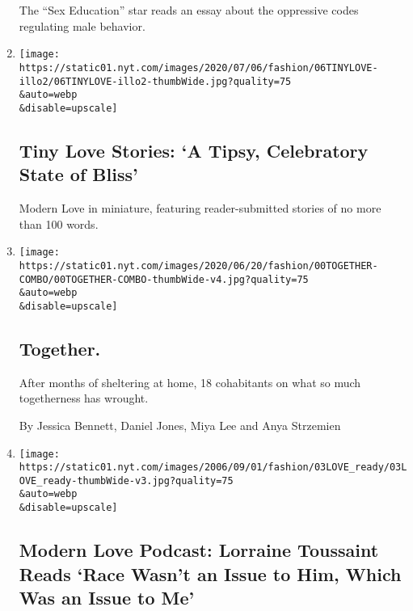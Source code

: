 \begin{enumerate}
  The ``Sex Education'' star reads an essay about the oppressive codes
  regulating male behavior.
\item
  \href{/2020/06/16/style/tiny-modern-love-stories-coronavirus-a-tipsy-celebratory-state-of-bliss.html}{}

  \texttt{[image: https://static01.nyt.com/images/2020/07/06/fashion/06TINYLOVE-illo2/06TINYLOVE-illo2-thumbWide.jpg?quality=75\\\&auto=webp\\\&disable=upscale]}

  \hypertarget{tiny-love-stories-a-tipsy-celebratory-state-of-bliss}{%
  \subsection{Tiny Love Stories: `A Tipsy, Celebratory State of
  Bliss'}\label{tiny-love-stories-a-tipsy-celebratory-state-of-bliss}}

  Modern Love in miniature, featuring reader-submitted stories of no
  more than 100 words.
\item
  \href{/2020/06/12/style/modern-love-coronavirus-living-together.html}{}

  \texttt{[image: https://static01.nyt.com/images/2020/06/20/fashion/00TOGETHER-COMBO/00TOGETHER-COMBO-thumbWide-v4.jpg?quality=75\\\&auto=webp\\\&disable=upscale]}

  \hypertarget{together}{%
  \subsection{Together.}\label{together}}

  After months of sheltering at home, 18 cohabitants on what so much
  togetherness has wrought.

  By Jessica Bennett, Daniel Jones, Miya Lee and Anya Strzemien
\item
  \href{/2020/06/10/style/modern-love-podcast-lorraine-toussant-updated-poscript.html}{}

  \texttt{[image: https://static01.nyt.com/images/2006/09/01/fashion/03LOVE\_ready/03LOVE\_ready-thumbWide-v3.jpg?quality=75\\\&auto=webp\\\&disable=upscale]}

  \hypertarget{modern-love-podcast-lorraine-toussaint-reads-race-wasnt-an-issue-to-him-which-was-an-issue-to-me}{%
  \subsection{Modern Love Podcast: Lorraine Toussaint Reads `Race Wasn't
  an Issue to Him, Which Was an Issue to
  Me'}\label{modern-love-podcast-lorraine-toussaint-reads-race-wasnt-an-issue-to-him-which-was-an-issue-to-me}}


\end{enumerate}
